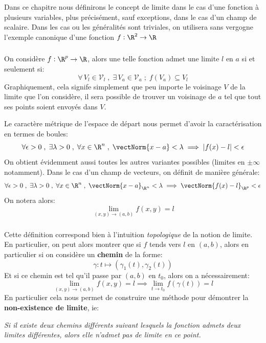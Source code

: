 \chapter*{}
Dans ce chapitre nous définirons le concept de limite dans le cas d'une fonction à plusieurs variables, plus précisément, sauf exceptions, dans le cas d'un champ de scalaire. Dans les cas ou les généralités sont triviales, on utilisera sans vergogne l'exemple canonique d'une fonction \(f : \R^2 \rightarrow \R\)

\subsection*{}
On considère \(f : \R^p \rightarrow \R\), alors une telle fonction admet une limite \(l\) en \(a\) si et seulement si:
\[
   \forall\, V_l \in \mathscr{V}_l \; , \; \exists\, V_a \in \mathscr{V}_a \; ; \; f(V_a) \subseteq V_l
\]
Graphiquement, cela signife simplement que peu importe le voisinage \(V\) de la limite que l'on considère,
il sera possible de trouver un voisinage de \(a\) tel que tout ses points soient envoyés dans \(V\).\<

Le caractère métrique de l'espace de départ nous permet d'avoir la caractérisation en termes de boules:
\[
   \forall \epsilon >0 \; , \; \exists \lambda > 0 \; , \; \forall x \in \R^n \; , \; \vectNorm{x - a} < \lambda \implies |f(x) - l| < \epsilon
\]
On obtient évidemment aussi toutes les autres variantes possibles (limites en \(\pm \infty\) notamment). Dans le cas d'un champ de vecteurs, on définit de manière générale:
\[
   \forall \epsilon >0 \; , \; \exists \lambda > 0 \; , \; \forall x \in \R^n \; , \; \vectNorm{x - a}_{\R^n} < \lambda \implies \vectNorm{f(x) - l}_{\R^p} < \epsilon
\]
On notera alors:
\[
   \lim_{(x, y) \rightarrow (a, b)} f(x, y) = l
\]
\subsection*{}
Cette définition correspond bien à l'intuition \textit{topologique} de la notion de limite. En particulier, on peut alors montrer que si \(f\) tends vers \(l\) en \((a, b)\), alors en particulier si on considère un \textbf{chemin} de la forme:
\[
   \gamma : t \mapsto (\gamma_1(t), \gamma_2(t))   
\]
Et si ce chemin est tel qu'il passe par \((a, b)\) en \(t_0\), alors on a nécessairement:
\[
   \lim_{(x, y) \rightarrow (a, b)} f(x, y) = l \implies \lim_{t \rightarrow t_0} f(\gamma(t)) = l
\]
En particulier cela nous permet de construire une méthode pour démontrer la \textbf{non-existence de limite}, ie:
\begin{center}
   \textit{Si il existe deux chemins différents suivant lesquels la fonction admets deux limites différentes, alors elle n'admet pas de limite en ce point.}
\end{center}
